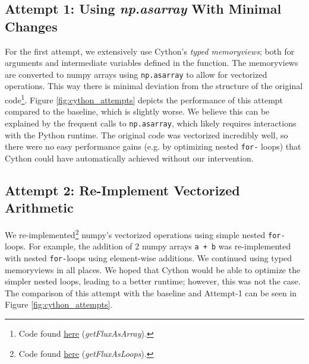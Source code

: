 \documentclass[a4paper,10pt]{article}
\begin{document}
\subsection{Attempt 1: Using \textit{np.asarray} With Minimal Changes}
For the first attempt, we extensively use Cython's \emph{typed memoryviews}; both for arguments and intermediate variables defined in the function.
The memoryviews are converted to numpy arrays using \verb|np.asarray| to allow for vectorized operations.
This way there is minimal deviation from the structure of the original code\footnote{Code found \href{https://github.com/paulmyr/DD2358-HPC25/blob/master/10_project_rishi_paul/code/cython/finitevolume_cython_lib.pyx\#L8}{here} (\textit{getFluxAsArray}).}.
Figure \ref{fig:cython_attempts} depicts the performance of this attempt compared to the baseline, which is slightly worse.
We believe this can be explained by the frequent calls to \verb|np.asarray|, which likely requires interactions with the Python runtime.
The original code was vectorized incredibly well, so there were no easy performance gains (e.g. by optimizing nested \verb|for-| loops) that Cython could have automatically achieved without our intervention.

\subsection{Attempt 2: Re-Implement Vectorized Arithmetic}
We re-implemented\footnote{Code found \href{https://github.com/paulmyr/DD2358-HPC25/blob/master/10_project_rishi_paul/code/cython/finitevolume_cython_lib.pyx\#L155}{here} (\textit{getFluxAsLoops}).} numpy's vectorized operations using simple nested \verb|for-|loops.
For example, the addition of 2 numpy arrays \verb|a + b| was re-implemented with nested \verb|for-|loops using element-wise additions.
We continued using typed memoryviews in all places.
We hoped that Cython would be able to optimize the simpler nested loops, leading to a better runtime; however, this was not the case.
The comparison of this attempt with the baseline and Attempt-1 can be seen in Figure \ref{fig:cython_attempts}. 
\end{document}
